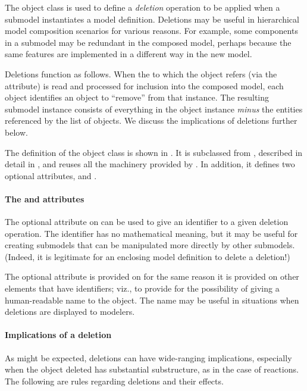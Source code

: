 The \Deletion object class is used to define a \emph{deletion} operation
to be applied when a submodel instantiates a model definition.
Deletions may be useful in hierarchical model composition scenarios for
various reasons.  For example, some components in a submodel may be
redundant in the composed model, perhaps because the same features are
implemented in a different way in the new model.

Deletions function as follows.  When the \Model to which the \Submodel
object refers (via the  attribute) is read and processed
for inclusion into the composed model, each \Deletion object identifies
an object to ``remove'' from that \Model instance.  The resulting
submodel instance consists of everything in the \Model object instance
\emph{minus} the entities referenced by the list of \Deletion objects.
We discuss the implications of deletions further below.

The definition of the \Deletion object class is shown in
.  It is subclassed from \SBaseRef, described in
detail in , and reuses all the machinery provided
by \SBaseRef.  In addition, it defines two optional attributes,
 and .


\paragraph{The \fixttspace{} and \fixttspace{} attributes}

The optional attribute  on \Deletion can be used to give an
identifier to a given deletion operation.  The identifier has no
mathematical meaning, but it may be useful for creating submodels that
can be manipulated more directly by other submodels.  (Indeed, it is
legitimate for an enclosing model definition to delete a deletion!)

The optional  attribute is provided on \Deletion for the
same reason it is provided on other elements that have identifiers;
viz., to provide for the possibility of giving a human-readable name to
the object.  The name may be useful in situations when deletions are
displayed to modelers.


\paragraph{Implications of a deletion}

As might be expected, deletions can have wide-ranging implications,
especially when the object deleted has substantial substructure, as in
the case of reactions.  The following are rules regarding deletions and
their effects.

